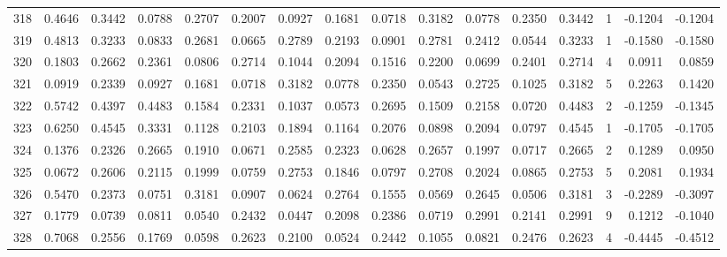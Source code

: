 \begin{tabular}{lrrrrrrrrrrrrrrr}
318 &      0.4646 &  0.3442 &  0.0788 &  0.2707 &  0.2007 &  0.0927 &  0.1681 &  0.0718 &  0.3182 &  0.0778 &   0.2350 &     0.3442 &      1 &                   -0.1204 &                    -0.1204 \\
319 &      0.4813 &  0.3233 &  0.0833 &  0.2681 &  0.0665 &  0.2789 &  0.2193 &  0.0901 &  0.2781 &  0.2412 &   0.0544 &     0.3233 &      1 &                   -0.1580 &                    -0.1580 \\
320 &      0.1803 &  0.2662 &  0.2361 &  0.0806 &  0.2714 &  0.1044 &  0.2094 &  0.1516 &  0.2200 &  0.0699 &   0.2401 &     0.2714 &      4 &                    0.0911 &                     0.0859 \\
321 &      0.0919 &  0.2339 &  0.0927 &  0.1681 &  0.0718 &  0.3182 &  0.0778 &  0.2350 &  0.0543 &  0.2725 &   0.1025 &     0.3182 &      5 &                    0.2263 &                     0.1420 \\
322 &      0.5742 &  0.4397 &  0.4483 &  0.1584 &  0.2331 &  0.1037 &  0.0573 &  0.2695 &  0.1509 &  0.2158 &   0.0720 &     0.4483 &      2 &                   -0.1259 &                    -0.1345 \\
323 &      0.6250 &  0.4545 &  0.3331 &  0.1128 &  0.2103 &  0.1894 &  0.1164 &  0.2076 &  0.0898 &  0.2094 &   0.0797 &     0.4545 &      1 &                   -0.1705 &                    -0.1705 \\
324 &      0.1376 &  0.2326 &  0.2665 &  0.1910 &  0.0671 &  0.2585 &  0.2323 &  0.0628 &  0.2657 &  0.1997 &   0.0717 &     0.2665 &      2 &                    0.1289 &                     0.0950 \\
325 &      0.0672 &  0.2606 &  0.2115 &  0.1999 &  0.0759 &  0.2753 &  0.1846 &  0.0797 &  0.2708 &  0.2024 &   0.0865 &     0.2753 &      5 &                    0.2081 &                     0.1934 \\
326 &      0.5470 &  0.2373 &  0.0751 &  0.3181 &  0.0907 &  0.0624 &  0.2764 &  0.1555 &  0.0569 &  0.2645 &   0.0506 &     0.3181 &      3 &                   -0.2289 &                    -0.3097 \\
327 &      0.1779 &  0.0739 &  0.0811 &  0.0540 &  0.2432 &  0.0447 &  0.2098 &  0.2386 &  0.0719 &  0.2991 &   0.2141 &     0.2991 &      9 &                    0.1212 &                    -0.1040 \\
328 &      0.7068 &  0.2556 &  0.1769 &  0.0598 &  0.2623 &  0.2100 &  0.0524 &  0.2442 &  0.1055 &  0.0821 &   0.2476 &     0.2623 &      4 &                   -0.4445 &                    -0.4512 \\

\end{tabular}
